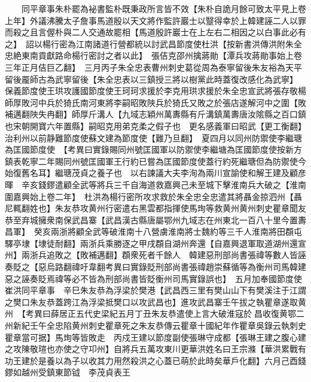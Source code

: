 　　同平章事朱朴罷為袐書監朴既秉政所言皆不效【朱朴自詭月餘可致太平見上卷上年】外議沸騰太子詹事馬道殷以天文將作監許巖士以毉得幸於上韓建誣二人以罪而殺之且言偓朴與二人交通故罷相【馬道殷許巖士在上左右二相因之以白事此必有之】　詔以楊行密為江南諸道行營都統以討武昌節度使杜洪【按新書洪傳洪附朱全忠絶東南貢獻路命楊行密討之者以此】　張佶克邵州擒蔣勛【潭兵攻蔣勛事始上卷三年正月佶巨乙翻】　三月丙子朱全忠表曹州刺史葛從周為泰寧留後朱友裕為天平留後龎師古為武寧留後【朱全忠表以三鎮授三將以樹黨此時蓋復改感化為武寧】　保義節度使王珙攻護國節度使王珂珂求援於李克用珙求援於朱全忠宣武將張存敬楊師厚敗河中兵於猗氏南河東將李嗣昭敗陜兵於猗氏又敗之於張店遂解河中之圍【敗補邁翻陜失冉翻】師厚斤溝人【九域志穎州萬夀縣有斤溝鎮萬夀唐汝隂縣之百口鎮也宋朝開寶六年置縣】嗣昭克用弟克柔之假子也　更名感義軍曰昭武【更工衡翻】治利州以前静難節度使蘇文建為節度使【難乃旦翻】　夏四月以同州防禦使李繼瑭為匡國節度使　【考異曰實錄賜同州號匡國軍以防禦使李繼塘為匡國節度使按新方鎮表乾寧二年賜同州號匡國軍王行約已嘗為匡國節度使蓋行約死繼瑭但為防禦使今始復舊名耳】繼瑭茂貞之養子也　以右諫議大夫李洵為兩川宣諭使和解王建及顧彦暉　辛亥錢鏐遣顧全武等將兵三千自海道救嘉興己未至城下擊淮南兵大破之【淮南圍嘉興始上卷二年】　杜洪為楊行密所攻求救於朱全忠全忠遣其將聶金掠泗州【聶尼輒翻姓也】朱友恭攻黄州行密遣右黑雲都指揮使馬珣等救黄州黄州刺史瞿章聞友恭至弃城擁衆南保武昌寨【武昌漢古縣唐屬鄂州九域志在州東北一百八十里今置夀昌軍】　癸亥兩浙將顧全武等破淮南十八營虜淮南將士魏約等三千人淮南將田頵屯驛亭埭【埭徒耐翻】兩浙兵乘勝逐之甲戌頵自湖州奔還【自嘉興退軍取道湖州還宣州】兩浙兵追敗之【敗補邁翻】頵衆死者千餘人　韓建惡刑部尚書張禕等數人皆誣奏貶之【惡烏路翻禕吁韋翻考異曰實錄貶刑部尚書張禕趙崇蘇循等為衡州司馬韓建惡之誣奏貶焉禕等必不皆為刑部尚書皆貶衡州司馬實錄誤也】　五月加奉國節度使崔洪同平章事　辛巳朱友恭為浮梁於樊港【武昌西三里有樊山山下有樊溪注于江謂之樊口朱友恭蓋跨江為浮梁抵樊口以攻武昌也】進攻武昌寨壬午拔之執瞿章遂取黄州　【考異曰薛居正五代史梁紀五月丁丑朱友恭遣使上言大破淮寇於昌收復黄鄂二州新紀壬午全忠陷黄州刺史瞿章死之朱友恭傳云瞿章十國紀年作瞿章吳錄云執刺史瞿章當可据】馬珣等皆敗走　丙戍王建以節度副使張琳守成都【張琳王建之腹心建之攻陳敬瑄也亦使之守卭州】自將兵五萬攻東川更華洪姓名曰王宗滌【華洪累戰有功王建於是養以為子以收其力用然殺洪之心蓋已萌於此時矣華戶化翻】六月己酉錢鏐如越州受鎮東節钺　李茂貞表王

